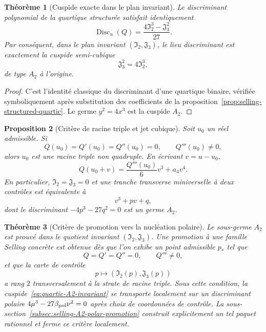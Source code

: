 \documentclass[11pt,a4paper]{article}
\newtheorem{theorem}{Théorème}[section]
\newtheorem{proposition}[theorem]{Proposition}
\begin{document}
\begin{theorem}[Cuspide exacte dans le plan invariant]\label{thm:quartic-discriminant-cusp}
Le discriminant polynomial de la quartique structurée satisfait identiquement
\begin{equation}\label{eq:quartic-disc-IJ}
 \boxed{\operatorname{Disc}_u(Q)=\frac{4\mathfrak I_2^3-\mathfrak J_3^2}{27}.}
\end{equation}
Par conséquent, dans le plan invariant $(\mathfrak I_2,\mathfrak J_3)$, le lieu discriminant est exactement la cuspide semi-cubique
\begin{equation}\label{eq:quartic-A2-invariant}
 \boxed{\mathfrak J_3^2=4\mathfrak I_2^3,}
\end{equation}
de type $A_2$ à l'origine.
\end{theorem}

\begin{proof}
C'est l'identité classique du discriminant d'une quartique binaire, vérifiée symboliquement après substitution des coefficients de la proposition~\ref{prop:selling-structured-quartic}. Le germe $y^2=4x^3$ est la cuspide $A_2$.
\end{proof}

\begin{proposition}[Critère de racine triple et jet cubique]\label{prop:triple-root-A2}
Soit $u_0$ un réel admissible. Si
\[
 Q(u_0)=Q'(u_0)=Q''(u_0)=0,
 \qquad Q'''(u_0)\neq0,
\]
alors $u_0$ est une racine triple non quadruple. En écrivant $v=u-u_0$,
\[
 Q(u_0+v)=\frac{Q'''(u_0)}6v^3+a_4v^4.
\]
En particulier, $\mathfrak I_2=\mathfrak J_3=0$ et une tranche transverse miniverselle à deux contrôles est équivalente à
\[
 v^3+p v+q,
\]
dont le discriminant $-4p^3-27q^2=0$ est un germe $A_2$.
\end{proposition}

\begin{theorem}[Critère de promotion vers la nucléation polaire]\label{thm:selling-invariant-A2-status}
Le sous-germe $A_2$ est prouvé dans le quotient invariant $(\mathfrak I_2,\mathfrak J_3)$. Une promotion à une famille Selling concrète est obtenue dès que l'on exhibe un point admissible $p_*$ tel que
\[
 Q=Q'=Q''=0,\qquad Q'''\neq0,
\]
et que la carte de contrôle
\[
 p\longmapsto (\mathfrak I_2(p),\mathfrak J_3(p))
\]
a rang $2$ transversalement à la strate de racine triple. Sous cette condition, la cuspide~\eqref{eq:quartic-A2-invariant} se transporte localement sur un discriminant polaire $4\mu^3-27\beta_{\rm pol}\nu^2=0$ après choix de coordonnées de contrôle. La sous-section~\ref{subsec:selling-A2-polar-promotion} construit explicitement un tel paquet rationnel et ferme ce critère localement.
\end{theorem}
\end{document}

